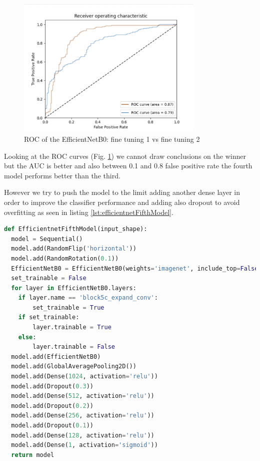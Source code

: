 \begin{figure}[h!]
    \centering
    \includegraphics[width=0.8\textwidth]{images/ROCEfficientNet.png}
    \caption{ROC of the EfficientNetB0: fine tuning 1 vs fine tuning 2}
    \label{fig:EfficientNetB0_ROC}
\end{figure}

Looking at the ROC curves (Fig. \ref{fig:EfficientNetB0_ROC}) we cannot draw conclusions on the winner but the AUC is better and also between 0.1 and 0.8 false positive rate the fourth model performs better than the third. 

However we try to push the model to the limit adding another dense layer in order to improve the classifier performance and adding also dropout to avoid overfitting as seen in listing \ref{lst:efficientnetFifthModel}.

\begin{lstlisting}[language=python, caption={EfficientNetB0 fifth model}, label={lst:efficientnetFifthModel}]
def EfficientnetFifthModel(input_shape):
  model = Sequential()
  model.add(RandomFlip('horizontal'))
  model.add(RandomRotation(0.1))
  EfficientNetB0 = EfficientNetB0(weights='imagenet', include_top=False, input_shape=input_shape)
  set_trainable = False
  for layer in EfficientNetB0.layers:
    if layer.name == 'block5c_expand_conv':
        set_trainable = True
    if set_trainable:
        layer.trainable = True
    else:
        layer.trainable = False
  model.add(EfficientNetB0)
  model.add(GlobalAveragePooling2D())
  model.add(Dense(1024, activation='relu'))
  model.add(Dropout(0.3))
  model.add(Dense(512, activation='relu'))
  model.add(Dropout(0.2))
  model.add(Dense(256, activation='relu'))
  model.add(Dropout(0.1))
  model.add(Dense(128, activation='relu'))
  model.add(Dense(1, activation='sigmoid'))
  return model
\end{lstlisting}


